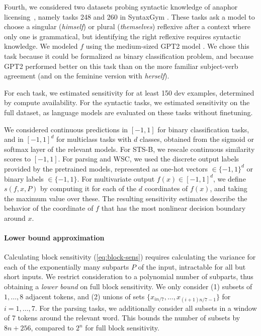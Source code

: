 \documentclass[11pt,a4paper]{article}
\begin{document}
Fourth, we considered two datasets probing syntactic knowledge of anaphor licensing~\citep{marvin2018targeted,hu2020a}, namely tasks 248 and 260 in SyntaxGym \citep{Gauthier:et-al:2020:syntaxgym}.
These tasks ask a model to choose a singular (\emph{himself}) or plural (\emph{themselves}) reflexive after a context where only one is grammatical, but identifying the right reflexive requires syntactic knowledge.
We modeled $f$ using the medium-sized GPT2 model \citep{radford2019language}.
We chose this task because it could be formalized as binary classification problem, and because GPT2 performed better on this task than on the more familiar subject-verb agreement (and on the feminine version with \emph{herself}).


For each task, we estimated sensitivity for at least 150 dev examples, determined by compute availability.
For the syntactic tasks, we estimated sensitivity on the full dataset, as language models are evaluated on these tasks without finetuning.

We considered continuous predictions in $[-1, 1]$ for binary classification tasks, and in $[-1,1]^d$ for multiclass tasks with $d$ classes, obtained from the sigmoid or softmax layer of the relevant models.
For STS-B, we rescale continuous similarity scores to $[-1, 1]$.
For parsing and WSC, we used the discrete output labels provided by the pretrained models, represented as one-hot vectors $\in \{-1,1\}^d$ or binary labels $\in \{-1,1\}$.
For multivariate output $f(x) \in [-1,1]^d$, we define $s(f,x,P)$ by computing it for each of the $d$ coordinates of $f(x)$, and taking the maximum value over these.
The resulting sensitivity estimates describe the behavior of the coordinate of $f$ that has the most nonlinear decision boundary around $x$.



\paragraph{Lower bound approximation}
Calculating block sensitivity (\ref{eq:block-sens}) requires calculating the variance for each of the exponentially many subparts $P$ of the input, intractable for all but short inputs.
We restrict consideration to a polynomial number of subparts, thus obtaining a \emph{lower bound} on full block sensitivity.
We only consider (1) subsets of $1, \dots, 8$ adjacent tokens, and  (2) unions of sets $\{x_{in/7}, \dots, x_{(i+1)n/7-1}\}$ for $i=1, \dots, 7$.
For the parsing tasks, we additionally consider all subsets in a window of 7 tokens around the relevant word.
This bounds the number of subsets by $8n+256$, compared to $2^n$ for full block sensitivity.
\end{document}
